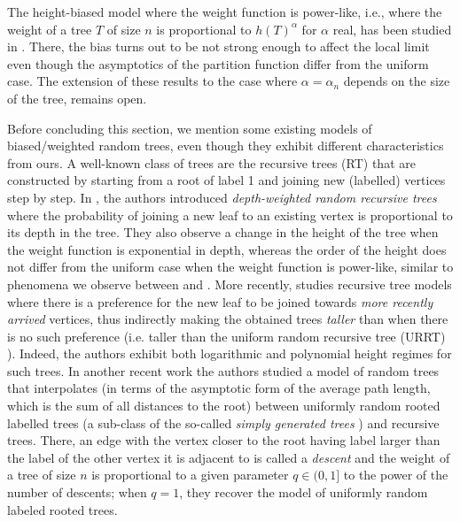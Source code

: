 \documentclass{article}
\newcommand{\1}{\mathbbm{1}}								%
\theoremstyle{definition}
\numberwithin{equation}{section}
\begin{document}
The height-biased model where the weight function is power-like, i.e., where the weight of a tree $T$ of size $n$ is proportional to $h(T)^\alpha$ for $\alpha$ real, has been studied in \cite{durhuus2022trees}. There, the bias turns out to be not strong enough to affect the local limit even though the asymptotics of the partition function differ from the uniform case. The extension of these results to the case where $\alpha=\alpha_n$ depends on the size of the tree, remains open. 

Before concluding this section, we mention some existing models of biased/weighted random trees, even though they exhibit different characteristics from ours. A well-known class of trees are the recursive trees (RT) that are constructed by starting from a root of label 1 and joining new (labelled) vertices step by step. In \cite{leckey2020height}, the authors introduced \emph{depth-weighted random recursive trees} where the probability of joining a new leaf to an existing vertex is proportional to its depth in the tree. They also observe a change in the height of the tree when the weight function is exponential in depth, whereas the order of the height does not differ from the uniform case when the weight function is power-like, similar to phenomena we observe between \cite{durhuus2022trees} and \cite{durhuus2003probabilistic}. {More recently, \cite{dicaprio} studies recursive tree models where there is a preference for the new leaf to be joined towards \emph{more recently arrived} vertices, thus indirectly making the obtained trees \emph{taller} than when there is no such preference (i.e. taller than the uniform random recursive tree (URRT) \cite{pittel1994note}). Indeed, the authors exhibit both logarithmic and polynomial height regimes for such trees.}
In another recent work \cite{thevenin2023local} the authors studied a model of random trees that interpolates (in terms of the asymptotic form of the average path length, which is the sum of all distances to the
root) between uniformly random rooted labelled trees (a sub-class of {the so-called \emph{simply generated trees} \cite{janson2012simply}}) and recursive trees. There, an edge with the vertex closer to the root having label larger than the label of the other vertex it is adjacent to is called a {\em descent} and  the weight of a tree of size $n$ is proportional to a given parameter $q \in (0,1]$ to the power of the number of descents; when $q=1$, they recover the model of uniformly random labeled rooted trees.
\end{document}
